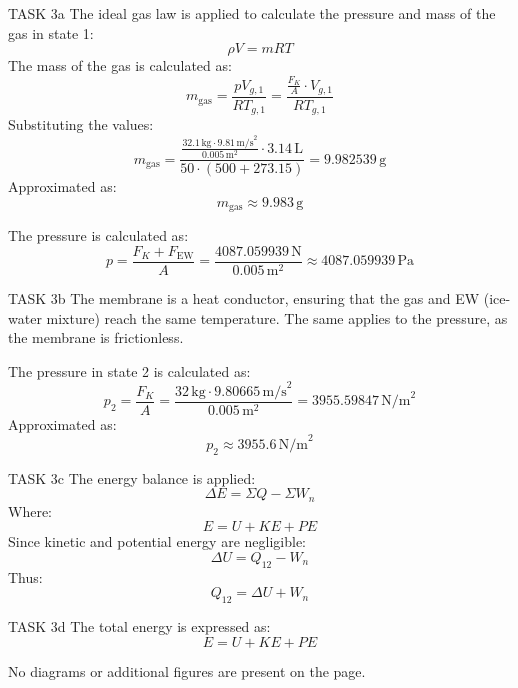 TASK 3a  
The ideal gas law is applied to calculate the pressure and mass of the gas in state 1:  
\[
\rho V = mRT
\]  
The mass of the gas is calculated as:  
\[
m_{\text{gas}} = \frac{p V_{g,1}}{R T_{g,1}} = \frac{\frac{F_K}{A} \cdot V_{g,1}}{R T_{g,1}}
\]  
Substituting the values:  
\[
m_{\text{gas}} = \frac{\frac{32.1 \, \text{kg} \cdot 9.81 \, \text{m/s}^2}{0.005 \, \text{m}^2} \cdot 3.14 \, \text{L}}{50 \cdot (500 + 273.15)} = 9.982539 \, \text{g}
\]  
Approximated as:  
\[
m_{\text{gas}} \approx 9.983 \, \text{g}
\]  

The pressure is calculated as:  
\[
p = \frac{F_K + F_{\text{EW}}}{A} = \frac{4087.059939 \, \text{N}}{0.005 \, \text{m}^2} \approx 4087.059939 \, \text{Pa}
\]  

TASK 3b  
The membrane is a heat conductor, ensuring that the gas and EW (ice-water mixture) reach the same temperature. The same applies to the pressure, as the membrane is frictionless.  

The pressure in state 2 is calculated as:  
\[
p_2 = \frac{F_K}{A} = \frac{32 \, \text{kg} \cdot 9.80665 \, \text{m/s}^2}{0.005 \, \text{m}^2} = 3955.59847 \, \text{N/m}^2
\]  
Approximated as:  
\[
p_2 \approx 3955.6 \, \text{N/m}^2
\]  

TASK 3c  
The energy balance is applied:  
\[
\Delta E = \Sigma Q - \Sigma W_n
\]  
Where:  
\[
E = U + KE + PE
\]  
Since kinetic and potential energy are negligible:  
\[
\Delta U = Q_{12} - W_n
\]  
Thus:  
\[
Q_{12} = \Delta U + W_n
\]  

TASK 3d  
The total energy is expressed as:  
\[
E = U + KE + PE
\]  

No diagrams or additional figures are present on the page.